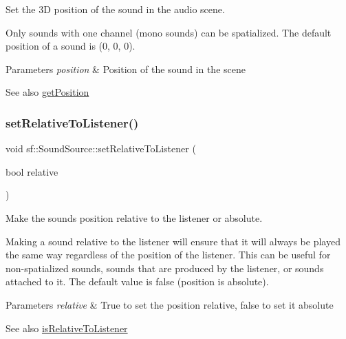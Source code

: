 Set the 3D position of the sound in the audio scene. 

Only sounds with one channel (mono sounds) can be spatialized. The default position of a sound is (0, 0, 0).


\begin{DoxyParams}{Parameters}
{\em position} & Position of the sound in the scene\\
\hline
\end{DoxyParams}
\begin{DoxySeeAlso}{See also}
\mbox{\hyperlink{classsf_1_1_sound_source_a8d199521f55550c7a3b2b0f6950dffa1}{get\+Position}} \begin{DoxyVerb}\end{DoxyVerb}
 
\end{DoxySeeAlso}
\mbox{\label{classsf_1_1_sound_source_ac478a8b813faf7dd575635b102081d0d}} 
\subsubsection{\texorpdfstring{setRelativeToListener()}{setRelativeToListener()}}
{\footnotesize\ttfamily void sf\+::\+Sound\+Source\+::set\+Relative\+To\+Listener (\begin{DoxyParamCaption}\item[{bool}]{relative }\end{DoxyParamCaption})}



Make the sound\textquotesingle{}s position relative to the listener or absolute. 

Making a sound relative to the listener will ensure that it will always be played the same way regardless of the position of the listener. This can be useful for non-\/spatialized sounds, sounds that are produced by the listener, or sounds attached to it. The default value is false (position is absolute).


\begin{DoxyParams}{Parameters}
{\em relative} & True to set the position relative, false to set it absolute\\
\hline
\end{DoxyParams}
\begin{DoxySeeAlso}{See also}
\mbox{\hyperlink{classsf_1_1_sound_source_adcdb4ef32c2f4481d34aff0b5c31534b}{is\+Relative\+To\+Listener}} \begin{DoxyVerb}\end{DoxyVerb}
 
\end{DoxySeeAlso}
\mbox{\label{classsf_1_1_sound_source_a2f192f2b49fb8e2b82f3498d3663fcc2}} 
